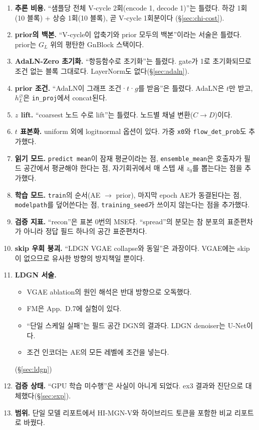 \documentclass[11pt]{article}
\newcommand{\code}[1]{\texttt{#1}}
\begin{document}
\begin{enumerate}
\item \textbf{추론 비용.} ``샘플당 전체 V-cycle 2회(encode 1, decode 1)''는
  틀렸다. 하강 1회(10 블록) + 상승 1회(10 블록), 곧 V-cycle 1회분이다
  (\S\ref{sec:chi-cost}).
\item \textbf{prior의 백본.} ``V-cycle이 압축기와 prior 모두의 백본''이라는
  서술은 틀렸다. prior는 $G_L$ 위의 평탄한 GnBlock 스택이다.
\item \textbf{AdaLN-Zero 초기화.} ``항등함수로 초기화''는 틀렸다. gate가 1로
  초기화되므로 조건 없는 블록 그대로다. LayerNorm도 없다(\S\ref{sec:adaln}).
\item \textbf{prior 조건.} ``AdaLN이 그래프 조건·$t$·$g$를 받음''은 틀렸다.
  AdaLN은 $t$만 받고, $h_L^{\varnothing}$은 \code{in\_proj}에서 concat된다.
\item \textbf{$z$ lift.} ``coarsest 노드 수로 lift''는 틀렸다. 노드별 채널
  변환($C\to D$)이다.
\item \textbf{$t$ 표본화.} uniform 외에 logitnormal 옵션이 있다. 가중
  \code{x0}와 \code{flow\_det\_prob}도 추가했다.
\item \textbf{읽기 모드.} \code{predict mean}이 잠재 평균이라는 점,
  \code{ensemble\_mean}은 호출자가 필드 공간에서 평균해야 한다는 점,
  자기회귀에서 매 스텝 새 $z_0$를 뽑는다는 점을 추가했다.
\item \textbf{학습 모드.} \code{train}의 순서(AE $\to$ prior), 마지막 epoch AE가
  동결된다는 점, \code{modelpath}를 덮어쓴다는 점, \code{training\_seed}가
  쓰이지 않는다는 점을 추가했다.
\item \textbf{검증 지표.} ``recon''은 표본 0번의 MSE다. ``spread''의 분모는
  참 분포의 표준편차가 아니라 정답 필드 하나의 공간 표준편차다.
\item \textbf{skip 우회 붕괴.} ``LDGN VGAE collapse와 동일''은 과장이다.
  VGAE에는 skip이 없으므로 유사한 방향의 방지책일 뿐이다.
\item \textbf{LDGN 서술.}
  \begin{itemize}
  \item VGAE ablation의 원인 해석은 반대 방향으로 오독했다.
  \item FM은 App.~D.7에 실험이 있다.
  \item ``단일 스케일 실패''는 필드 공간 DGN의 결과다. LDGN denoiser는 U-Net이다.
  \item 조건 인코더는 AE의 모든 레벨에 조건을 넣는다.
  \end{itemize}
  (\S\ref{sec:ldgn})
\item \textbf{검증 상태.} ``GPU 학습 미수행''은 사실이 아니게 되었다. ex3 결과와
  진단으로 대체했다(\S\ref{sec:exp}).
\item \textbf{범위.} 단일 모델 리포트에서 HI-MGN-V와 하이브리드 토큰을
  포함한 비교 리포트로 바꿨다.
\end{enumerate}
\end{document}
